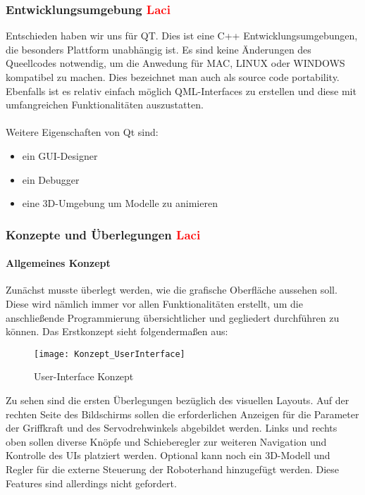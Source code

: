 \documentclass[titlepage,12pt,twoside]{article}
\begin{document}
\subsubsection{Entwicklungsumgebung \textcolor{red}{Laci}}

Entschieden haben wir uns für QT. Dies ist eine C++ Entwicklungsumgebungen, die besonders Plattform unabhängig ist. Es sind keine Änderungen
des Queellcodes notwendig, um die Anwedung für MAC, LINUX oder WINDOWS kompatibel zu machen. Dies bezeichnet man auch als source 
code portability. Ebenfalls ist es relativ einfach möglich QML-Interfaces zu erstellen und diese mit umfangreichen Funktionalitäten auszustatten. \\
\\ 
Weitere Eigenschaften von Qt sind:
\begin{itemize}
	\item ein GUI-Designer
	\item ein Debugger
	\item eine 3D-Umgebung um Modelle zu animieren
\end{itemize}

\subsubsection{Konzepte und Überlegungen \textcolor{red}{Laci}}

\paragraph{Allgemeines Konzept}
\hfill \break
\hfill \break
Zunächst musste überlegt werden, wie die grafische Oberfläche aussehen soll. Diese wird nämlich immer vor allen Funktionalitäten 
erstellt, um die anschließende Programmierung übersichtlicher und gegliedert durchführen zu können. Das Erstkonzept sieht folgendermaßen aus:
\begin{figure}[H]
	\begin{center}
		\scalebox{1.2}
		{\texttt{[image: Konzept\_UserInterface]}}
		\caption{User-Interface Konzept}
		\label{fig:Konzept_UserInterface}				
	\end{center}
\end{figure}
\hfill \break
Zu sehen sind die ersten Überlegungen bezüglich des visuellen Layouts. Auf der rechten Seite des Bildschirms sollen die erforderlichen
Anzeigen für die Parameter der Griffkraft und des Servodrehwinkels abgebildet werden. Links und rechts oben sollen diverse Knöpfe 
und Schieberegler zur weiteren Navigation und Kontrolle des UIs platziert werden. Optional kann noch ein 3D-Modell und Regler für 
die externe Steuerung der Roboterhand hinzugefügt werden. Diese Features sind allerdings nicht gefordert. \\
\\
\end{document}
